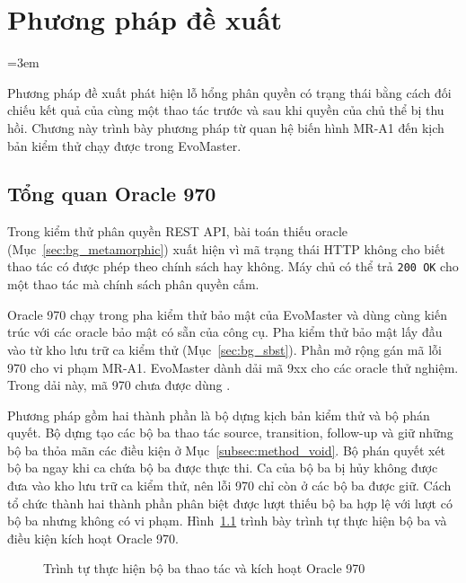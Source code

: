 \chapter{Phương pháp đề xuất}
\label{chap:method}

\begingroup
\emergencystretch=3em

Phương pháp đề xuất phát hiện lỗ hổng phân quyền có trạng thái bằng cách đối chiếu kết quả của cùng một thao tác trước và sau khi quyền của chủ thể bị thu hồi. Chương này trình bày phương pháp từ quan hệ biến hình MR-A1 đến kịch bản kiểm thử chạy được trong EvoMaster.

\section{Tổng quan Oracle 970}
\label{sec:method_overview}

Trong kiểm thử phân quyền REST API, bài toán thiếu oracle (Mục~\ref{sec:bg_metamorphic}) xuất hiện vì mã trạng thái HTTP không cho biết thao tác có được phép theo chính sách hay không. Máy chủ có thể trả \texttt{200 OK} cho một thao tác mà chính sách phân quyền cấm.

Oracle 970 chạy trong pha kiểm thử bảo mật của EvoMaster và dùng cùng kiến trúc với các oracle bảo mật có sẵn của công cụ. Pha kiểm thử bảo mật lấy đầu vào từ kho lưu trữ ca kiểm thử (Mục~\ref{sec:bg_sbst}). Phần mở rộng gán mã lỗi 970 cho vi phạm MR-A1. EvoMaster dành dải mã 9xx cho các oracle thử nghiệm. Trong dải này, mã 970 chưa được dùng \cite{evomaster611}.

Phương pháp gồm hai thành phần là bộ dựng kịch bản kiểm thử và bộ phán quyết. Bộ dựng tạo các bộ ba thao tác source, transition, follow-up và giữ những bộ ba thỏa mãn các điều kiện ở Mục~\ref{subsec:method_void}. Bộ phán quyết xét bộ ba ngay khi ca chứa bộ ba được thực thi. Ca của bộ ba bị hủy không được đưa vào kho lưu trữ ca kiểm thử, nên lỗi 970 chỉ còn ở các bộ ba được giữ. Cách tổ chức thành hai thành phần phân biệt được lượt thiếu bộ ba hợp lệ với lượt có bộ ba nhưng không có vi phạm. Hình~\ref{fig:triple_sequence} trình bày trình tự thực hiện bộ ba và điều kiện kích hoạt Oracle 970.

\begin{figure}[htbp]
  \centering
  
  \caption{Trình tự thực hiện bộ ba thao tác và kích hoạt Oracle 970}
  \label{fig:triple_sequence}
\end{figure}

